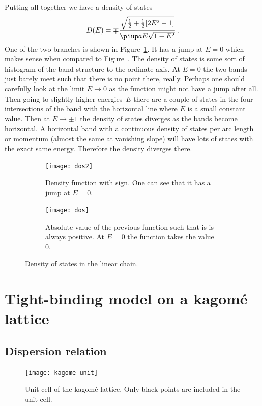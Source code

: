 \documentclass[11pt, english, fleqn, DIV=15, headinclude, BCOR=1cm]{scrartcl}
\begin{document}
Putting all together we have a density of states
\[
    D(E) = \mp \frac{\sqrt{\frac 12 + \frac 12 [2 E^2 - 1]}}{\piup a E \sqrt{1 -
    E^2}} \,.
\]
One of the two branches is shown in Figure~\ref{fig:dos/2}. It has a jump at $E
= 0$ which makes sense when compared to Figure~\label{fig:band-3}. The density
of states is some sort of histogram of the band structure to the ordinate axis.
At $E = 0$ the two bands just barely meet such that there is no point there,
really. Perhaps one should carefully look at the limit $E \to 0$ as the
function might not have a jump after all. Then going to slightly higher
energies~$E$ there are a couple of states in the four intersections of the band
with the horizontal line where $E$ is a small constant value. Then at $E \to
\pm 1$ the density of states diverges as the bands become horizontal. A
horizontal band with a continuous density of states per arc length or momentum
(almost the same at vanishing slope) will have lots of states with the exact
same energy. Therefore the density diverges there.

\begin{figure}
    \begin{subfigure}[t]{0.47\linewidth}
        \centering
        \texttt{[image: dos2]}
        \caption{%
            Density function with sign. One can see that it has a jump at $E =
            0$.
        }
        \label{fig:dos/2}
    \end{subfigure}
    \hfill
    \begin{subfigure}[t]{0.47\linewidth}
        \centering
        \texttt{[image: dos]}
        \caption{%
            Absolute value of the previous function such that is is always
            positive. At $E = 0$ the function takes the value 0.
        }
        \label{fig:dos/1}
    \end{subfigure}
    \caption{%
        Density of states in the linear chain.
    }
    \label{fig:dos}
\end{figure}


\section{Tight-binding model on a kagomé lattice}
\label{homework:2}

\subsection{Dispersion relation}

\begin{figure}
    \centering
    \texttt{[image: kagome-unit]}
    \caption{%
        Unit cell of the kagomé lattice. Only black points are included in the
        unit cell.
    }
    \label{fig:kagome-unit}
\end{figure}
\end{document}
